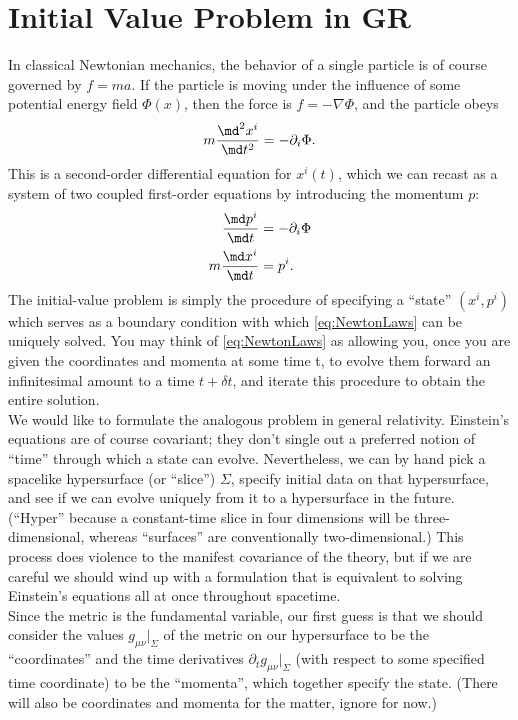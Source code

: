  \section{Initial Value Problem in GR}
 In classical Newtonian mechanics, the behavior of a single particle is of course governed
 by $f = ma$. If the particle is moving under the influence of some potential energy field $Φ(x)$,
 then the force is $f = −∇Φ$, and the particle obeys
 \begin{equation}
 m \frac{\md^2 x^i}{\md t^2} = - \partial_i \Phi.
 \end{equation}
 This is a second-order differential equation for $x^i (t)$, which we can recast as a system of two
 coupled first-order equations by introducing the momentum $p$:
 \begin{align}
 	\label{eq:NewtonLaws}
 	\frac{\md p^i}{\md t} &= -\partial_i \Phi \\
 	m \frac{\md x^i}{\md t} &= p^i.
 \end{align}
 The initial-value problem is simply the procedure of specifying a “state” $(x^i , p^i )$ which serves
 as a boundary condition with which \ref{eq:NewtonLaws} can be uniquely solved. You may think of \ref{eq:NewtonLaws}
 as allowing you, once you are given the coordinates and momenta at some time t, to evolve
 them forward an infinitesimal amount to a time $t + δt$, and iterate this procedure to obtain
 the entire solution.
 \\
 We would like to formulate the analogous problem in general relativity. Einstein’s equations are of course covariant; they don’t single out a preferred notion of “time”
 through which a state can evolve. Nevertheless, we can by hand pick a spacelike hypersurface
 (or “slice”) $Σ$, specify initial data on that hypersurface, and see if we can evolve uniquely
 from it to a hypersurface in the future. (“Hyper” because a constant-time slice in four dimensions will be three-dimensional, whereas “surfaces” are conventionally two-dimensional.)
 This process does violence to the manifest covariance of the theory, but if we are careful we
 should wind up with a formulation that is equivalent to solving Einstein’s equations all at
 once throughout spacetime.\\
 Since the metric is the fundamental variable, our first guess is that we should consider
 the values $g_{μν} |_Σ$ of the metric on our hypersurface to be the “coordinates” and the time
 derivatives $∂_t g_{μν} |_Σ$ (with respect to some specified time coordinate) to be the “momenta”,
 which together specify the state. (There will also be coordinates and momenta for the matter, ignore for now.)\\
